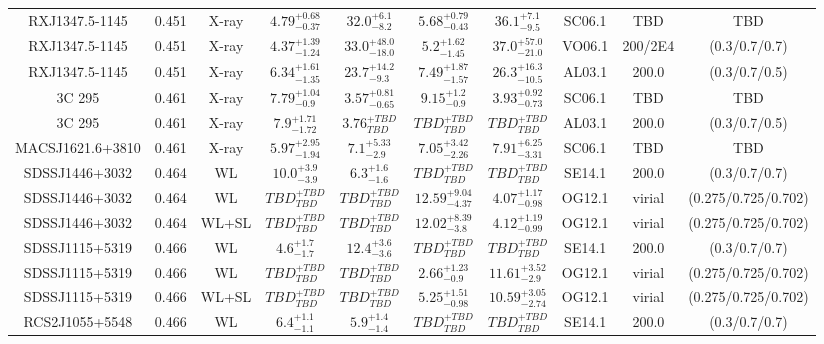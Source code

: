 \begin{table}
\begin{tabular}{cccccccccc}
RXJ1347.5-1145 & 0.451 & X-ray & ${4.79}^{+0.68}_{-0.37}$ & ${32.0}^{+6.1}_{-8.2}$ & ${5.68}^{+0.79}_{-0.43}$ & ${36.1}^{+7.1}_{-9.5}$ & SC06.1 & TBD & TBD \\
RXJ1347.5-1145 & 0.451 & X-ray & ${4.37}^{+1.39}_{-1.24}$ & ${33.0}^{+48.0}_{-18.0}$ & ${5.2}^{+1.62}_{-1.45}$ & ${37.0}^{+57.0}_{-21.0}$ & VO06.1 & 200/2E4 & (0.3/0.7/0.7) \\
RXJ1347.5-1145 & 0.451 & X-ray & ${6.34}^{+1.61}_{-1.35}$ & ${23.7}^{+14.2}_{-9.3}$ & ${7.49}^{+1.87}_{-1.57}$ & ${26.3}^{+16.3}_{-10.5}$ & AL03.1 & 200.0 & (0.3/0.7/0.5) \\
3C 295 & 0.461 & X-ray & ${7.79}^{+1.04}_{-0.9}$ & ${3.57}^{+0.81}_{-0.65}$ & ${9.15}^{+1.2}_{-0.9}$ & ${3.93}^{+0.92}_{-0.73}$ & SC06.1 & TBD & TBD \\
3C 295 & 0.461 & X-ray & ${7.9}^{+1.71}_{-1.72}$ & ${3.76}^{+TBD}_{TBD}$ & ${TBD}^{+TBD}_{TBD}$ & ${TBD}^{+TBD}_{TBD}$ & AL03.1 & 200.0 & (0.3/0.7/0.5) \\
MACSJ1621.6+3810 & 0.461 & X-ray & ${5.97}^{+2.95}_{-1.94}$ & ${7.1}^{+5.33}_{-2.9}$ & ${7.05}^{+3.42}_{-2.26}$ & ${7.91}^{+6.25}_{-3.31}$ & SC06.1 & TBD & TBD \\
SDSSJ1446+3032 & 0.464 & WL & ${10.0}^{+3.9}_{-3.9}$ & ${6.3}^{+1.6}_{-1.6}$ & ${TBD}^{+TBD}_{TBD}$ & ${TBD}^{+TBD}_{TBD}$ & SE14.1 & 200.0 & (0.3/0.7/0.7) \\
SDSSJ1446+3032 & 0.464 & WL & ${TBD}^{+TBD}_{TBD}$ & ${TBD}^{+TBD}_{TBD}$ & ${12.59}^{+9.04}_{-4.37}$ & ${4.07}^{+1.17}_{-0.98}$ & OG12.1 & virial & (0.275/0.725/0.702) \\
SDSSJ1446+3032 & 0.464 & WL+SL & ${TBD}^{+TBD}_{TBD}$ & ${TBD}^{+TBD}_{TBD}$ & ${12.02}^{+8.39}_{-3.8}$ & ${4.12}^{+1.19}_{-0.99}$ & OG12.1 & virial & (0.275/0.725/0.702) \\
SDSSJ1115+5319 & 0.466 & WL & ${4.6}^{+1.7}_{-1.7}$ & ${12.4}^{+3.6}_{-3.6}$ & ${TBD}^{+TBD}_{TBD}$ & ${TBD}^{+TBD}_{TBD}$ & SE14.1 & 200.0 & (0.3/0.7/0.7) \\
SDSSJ1115+5319 & 0.466 & WL & ${TBD}^{+TBD}_{TBD}$ & ${TBD}^{+TBD}_{TBD}$ & ${2.66}^{+1.23}_{-0.9}$ & ${11.61}^{+3.52}_{-2.9}$ & OG12.1 & virial & (0.275/0.725/0.702) \\
SDSSJ1115+5319 & 0.466 & WL+SL & ${TBD}^{+TBD}_{TBD}$ & ${TBD}^{+TBD}_{TBD}$ & ${5.25}^{+1.51}_{-0.98}$ & ${10.59}^{+3.05}_{-2.74}$ & OG12.1 & virial & (0.275/0.725/0.702) \\
RCS2J1055+5548 & 0.466 & WL & ${6.4}^{+1.1}_{-1.1}$ & ${5.9}^{+1.4}_{-1.4}$ & ${TBD}^{+TBD}_{TBD}$ & ${TBD}^{+TBD}_{TBD}$ & SE14.1 & 200.0 & (0.3/0.7/0.7) \\

\end{tabular}
\end{table}

